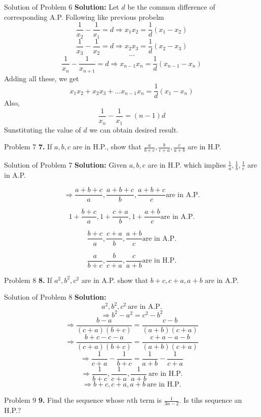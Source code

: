 \documentclass[aspectratio=1610,8pt]{beamer}
\begin{document}
\begin{frame}{Solution of Problem 6}
  \textbf{Solution:} Let $d$ be the common difference of corresponding
  A.P. Following like previous probelm
  $$\frac{1}{x_2} - \frac{1}{x_1} = d \Rightarrow x_1x_2 = \frac{1}{d}(x_1 -
  x_2)$$
  $$\frac{1}{x_3} - \frac{1}{x_2} = d \Rightarrow x_2x_3 = \frac{1}{d}(x_2 -
  x_3)$$
  $$\ldots$$
  $$\frac{1}{x_n} - \frac{1}{x_{n + 1}} = d \Rightarrow x_{n - 1}x_n =
  \frac{1}{d}(x_{n - 1} - x_n)$$
  Adding all these, we get
  $$x_1x_2 + x_2x_3 + \ldots x_{n - 1}x_n = \frac{1}{d}(x_1 - x_n)$$
  Also,
  $$\frac{1}{x_n} - \frac{1}{x_1} = (n - 1)d$$
  Sunstituting the value of $d$ we can obtain desired result.
\end{frame}
\begin{frame}{Problem 7}
  \textbf{7.} If $a, b, c$ are in H.P., show that $\frac{a}{b + c}, \frac{b}{c
    + a}, \frac{c}{a + b}$ are in H.P.
\end{frame}
\begin{frame}{Solution of Problem 7}
  \textbf{Solution:} Given $a, b, c$ are in H.P. which implies $\frac{1}{a},
  \frac{1}{b}, \frac{1}{c}$ are in A.P.

  $$\Rightarrow \frac{a + b + c}{a}, \frac{a + b + c}{b}, \frac{a + b + c}{c}
  \text{are in A.P.}$$

  $$1 + \frac{b + c}{a}, 1 + \frac{c + a}{b}, 1 + \frac{a + b}{c} \text{are in
    A.P.}$$

  $$\frac{b + c}{a}, \frac{c + a}{b}, \frac{a + b}{c} \text{are in A.P.}$$

  $$\frac{a}{b + c}, \frac{b}{c + a}, \frac{c}{a + b} \text{are in H.P.}$$
\end{frame}
\begin{frame}{Problem 8}
  \textbf{8.} If $a^2, b^2, c^2$ are in A.P. show that $b + c, c + a, a + b$
  are in A.P.
\end{frame}
\begin{frame}{Solution of Problem 8}
  \textbf{Solution:} $$a^2, b^2, c^2~\text{are in A.P.}$$
  $$\Rightarrow b^2 - a^2 = c^2 - b^2$$
  $$\Rightarrow \frac{b - a}{(c + a)(b + c)} = \frac{c - b}{(a + b)(c + a)}$$
  $$\Rightarrow \frac{b + c - c - a}{(c + a)(b + c)} = \frac{c + a - a -b}{(a +
    b)(c + a)}$$
  $$\Rightarrow \frac{1}{c + a} - \frac{1}{b + c} = \frac{1}{a + b} -
  \frac{1}{c + a}$$
  $$\Rightarrow \frac{1}{b + c}, \frac{1}{c + a}, \frac{1}{a + b}~\text{are in
    H.P.}$$
  $$\Rightarrow b + c, c + a, a + b~\text{are in H.P.}$$
\end{frame}
\begin{frame}{Problem 9}
  \textbf{9.} Find the sequence whose $n$th term is $\frac{1}{3n - 2}.$ Is tihs
  sequence an H.P.?
\end{frame}
\end{document}
